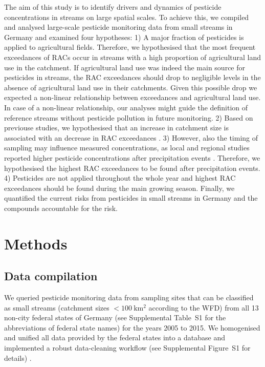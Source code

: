 \documentclass[journal=esthag,manuscript=article]{achemso}
\begin{document}
The aim of this study is to identify drivers and dynamics of pesticide concentrations in streams on large spatial scales.
To achieve this, we compiled and analysed large-scale pesticide monitoring data from small streams in Germany and examined four hypotheses:
1) A major fraction of pesticides is applied to agricultural fields.
Therefore, we hypothesised that the most frequent exceedances of RACs occur in streams with a high proportion of agricultural land use in the catchment. 
If agricultural land use was indeed the main source for pesticides in streams, the RAC exceedances should drop to negligible levels in the absence of agricultural land use in their catchments. 
Given this possible drop we expected a non-linear relationship between exceedances and agricultural land use.
In case of a non-linear relationship, our analyses might guide the definition of reference streams without pesticide pollution in future monitoring. 
2) Based on previouse studies, we hypothesised that an increase in catchment size is associated with an decrease in RAC exceedances \citep{stehle_pesticide_2015,schulz_field_2004}. 
3) However, also the timing of sampling may influence measured concentrations,
as local and regional studies reported higher pesticide concentrations after precipitation events \citep{liess_determination_1999,Xing_Chow_Rees_Meng_Li_Ernst_Benoy_Zha_Hewitt_2013}. 
Therefore, we hypothesised the highest RAC exceedances to be found after precipitation events. 
4) Pesticides are not applied throughout the whole year and highest RAC exceedances should be found during the main growing season.
Finally, we quantified the current risks from pesticides in small streams in Germany and the compounds accountable for the risk. 



\section{Methods}
\subsection{Data compilation}
We queried pesticide monitoring data from sampling sites that can be classified as small streams (catchment sizes $\mathrm{< 100~km^2}$ according to the WFD) from all 13 non-city federal states of Germany (see Supplemental Table~S1 for the abbreviations of federal state names) for the years 2005 to 2015.
We homogenised and unified all data provided by the federal states into a database and implemented a robust data-cleaning workflow (see Supplemental Figure~S1 for details) \citep{poisot_best_2015}.
\end{document}
